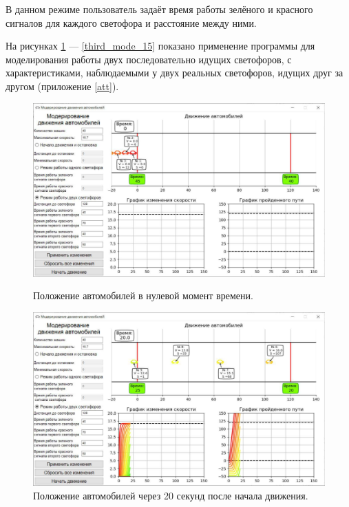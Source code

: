 \documentclass[12pt, a4paper]{extarticle}
\numberwithin{equation}{section}
\numberwithin{figure}{section}
\begin{document}
В данном режиме пользователь задаёт время работы зелёного и красного сигналов для каждого светофора и расстояние между ними. 

На рисунках \ref{third_mode_1} --- \ref{third_mode_15} показано применение программы для моделирования работы двух последовательно идущих светофоров, с характеристиками, наблюдаемыми у двух реальных светофоров, идущих друг за другом (приложение \ref{att}).

\begin{figure}[H]
	\begin{center}
		\begin{minipage}[h]{0.48\linewidth}
			\includegraphics[width=1\linewidth]
			{Images/screens/third_mode_1}
			\caption{Положение автомобилей в нулевой момент времени.} 
			\label{third_mode_1}
		\end{minipage}
		\hfill 
		\begin{minipage}[h]{0.48\linewidth}
			\includegraphics[width=1\linewidth]
			{Images/screens/third_mode_2}
			\caption{Положение автомобилей через 20 секунд после начала движения.}

\end{minipage}
\end{center}
\end{figure}
\end{document}
